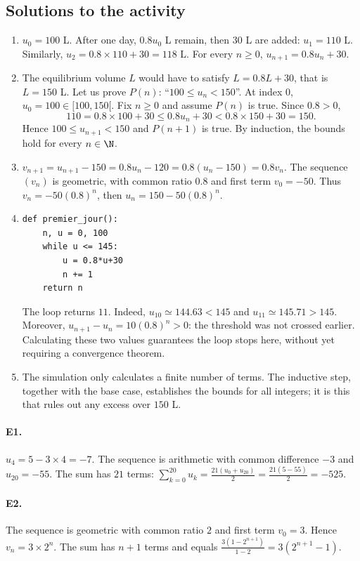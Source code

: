 \subsection{Solutions to the activity}\begin{enumerate}
\item $u_0=100$ L. After one day, $\num{0,8}u_0$ L remain, then $30$ L are added: $u_1=110$ L. Similarly, $u_2=\num{0,8}\times110+30=118$ L. For every $n\ge0$, $u_{n+1}=\num{0,8}u_n+30$.
\item The equilibrium volume $L$ would have to satisfy $L=\num{0,8}L+30$, that is $L=150$ L. Let us prove $P(n)$: ``$100\le u_n<150$''. At index $0$, $u_0=100\in[100,150[$. Fix $n\ge0$ and assume $P(n)$ is true. Since $\num{0,8}>0$,
\[110=\num{0,8}\times100+30\le\num{0,8}u_n+30<\num{0,8}\times150+30=150.\]
Hence $100\le u_{n+1}<150$ and $P(n+1)$ is true. By induction, the bounds hold for every $n\in\N$.
\item $v_{n+1}=u_{n+1}-150=\num{0,8}u_n-120=\num{0,8}(u_n-150)=\num{0,8}v_n$. The sequence $(v_n)$ is geometric, with common ratio $\num{0,8}$ and first term $v_0=-50$. Thus $v_n=-50(\num{0,8})^n$, then $u_n=150-50(\num{0,8})^n$.
\item 
\begin{lstlisting}
def premier_jour():
    n, u = 0, 100
    while u <= 145:
        u = 0.8*u+30
        n += 1
    return n
\end{lstlisting}
The loop returns $11$. Indeed, $u_{10}\simeq\num{144,63}<145$ and $u_{11}\simeq\num{145,71}>145$. Moreover, $u_{n+1}-u_n=10(\num{0,8})^n>0$: the threshold was not crossed earlier. Calculating these two values guarantees the loop stops here, without yet requiring a convergence theorem.
\item The simulation only calculates a finite number of terms. The inductive step, together with the base case, establishes the bounds for all integers; it is this that rules out any excess over $150$ L.
\end{enumerate}

\paragraph{E1.}$u_4=5-3\times4=-7$. The sequence is arithmetic with common difference $-3$ and $u_{20}=-55$. The sum has $21$ terms: $\sum_{k=0}^{20}u_k=\frac{21(u_0+u_{20})}{2}=\frac{21(5-55)}{2}=-525$.

\paragraph{E2.}The sequence is geometric with common ratio $2$ and first term $v_0=3$. Hence $v_n=3\times2^n$. The sum has $n+1$ terms and equals $\frac{3(1-2^{n+1})}{1-2}=3(2^{n+1}-1)$.

